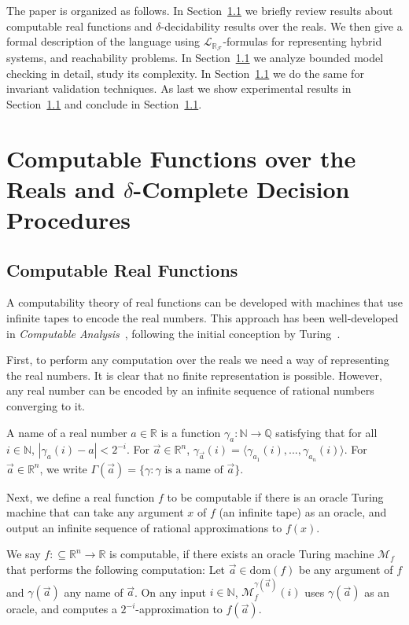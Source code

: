 \documentclass[envcountsect]{llncs}
\newcommand{\dom}{\mathrm{dom}}
\newcommand{\lrf}{\mathcal{L}_{\mathbb{R}_{\mathcal{F}}}}
\begin{document}
The paper is organized as follows. In Section~\ref{} we briefly review results 
about computable real functions and $\delta$-decidability results over the
reals. We then give a formal description of the language using $\lrf$-formulas
for representing hybrid systems, and reachability problems. In Section~\ref{} we
analyze bounded model checking in detail, study its complexity. In
Section~\ref{} we do the same for invariant validation techniques. As last we
show experimental results in Section~\ref{} and conclude in Section~\ref{}.

 
\section{Computable Functions over the Reals and $\delta$-Complete Decision
Procedures}

\subsection{Computable Real Functions}

A computability theory of real functions can be developed with machines that 
use infinite tapes to encode the real numbers. This approach has been
well-developed in {\em Computable Analysis}~\cite{CAbook,Kobook,vasco},
following the initial conception by Turing~\cite{}.

First, to perform any computation over the reals we need a way of representing 
the real numbers. It is clear that no finite representation is possible.
However, any real number can be encoded by an infinite sequence of rational
numbers converging to it. 
\begin{definition}[Names]
A name of a real number $a\in \mathbb{R}$ is a function
$\mathcal{\gamma}_a: \mathbb{N}\rightarrow \mathbb{Q}$ satisfying that for all
$i\in \mathbb{N}$, $|\gamma_a(i) - a|<2^{-i}.$ For $\vec a\in \mathbb{R}^n$,
$\gamma_{\vec a}(i) = \langle \gamma_{a_1}(i), ..., \gamma_{a_n}(i)\rangle$. For
$\vec a\in \mathbb{R}^n$, we write $\Gamma(\vec a) = \{\gamma: \gamma\mbox{ is a
name of }\vec a\}$. 
\end{definition}

Next, we define a real function $f$ to be computable if there is an oracle 
Turing machine that can take any argument $x$ of $f$ (an infinite tape) as an
oracle, and output an infinite sequence of rational approximations to $f(x)$. 

\begin{definition} We say
$f:\subseteq\mathbb{R}^n\rightarrow \mathbb{R}$ is computable, if there exists
an oracle Turing machine $\mathcal{M}_f$ that performs the following
computation: Let $\vec a\in \dom(f)$ be any argument of $f$ and $\gamma(\vec a)$
any name of $\vec a$. On any input $i\in \mathbb{N}$,
$\mathcal{M}_f^{\gamma(\vec a)}(i)$ uses $\gamma(\vec a)$ as an oracle, and
computes a $2^{-i}$-approximation to $f(\vec a)$. 
\end{definition}
\end{document}
